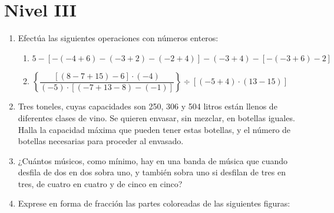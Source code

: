 \documentclass[twoside]{article}
\begin{document}
\section*{Nivel III}
\begin{enumerate}
\item Efectúa las siguientes operaciones con números enteros:
\begin{enumerate}
\item $5-[-(-4+6)-(-3+2)-(-2+4)]-(-3+4)-[-(-3+6)-2]$
\item $\left\{\dfrac{[(8-7+15)-6]\cdot (-4)}{(-5)\cdot [(-7+13-8)-(-1)]}\right\}\div [(-5+4)\cdot (13-15)]$
\end{enumerate}
\item Tres toneles, cuyas capacidades son 250, 306 y 504 litros están llenos de diferentes clases de vino. Se quieren envasar, sin mezclar, en botellas iguales. Halla la capacidad máxima que pueden tener estas botellas, y el número de botellas necesarias para proceder al envasado.
\item ¿Cuántos músicos, como mínimo, hay en una banda de música que cuando desfila de dos en dos sobra uno, y también sobra uno si desfilan de tres en tres, de cuatro en cuatro y de cinco en cinco?
\item Exprese en forma de fracción las partes coloreadas de las siguientes figuras:
\begin{enumerate}
\end{enumerate}
\end{enumerate}
\end{document}
